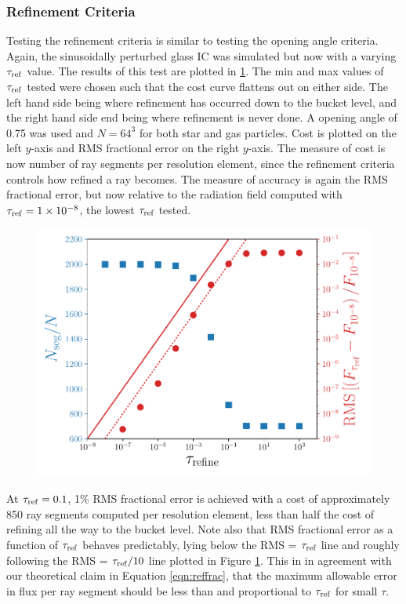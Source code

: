 \documentclass[fleq,usenatbib]{mnras}
\providecommand{\e}[1]{\ensuremath{\times10^{#1}}}
\newcommand{\tr}{\tau_{\rm ref}}
\begin{document}
\subsubsection{Refinement Criteria}
Testing the refinement criteria is similar to testing the opening angle 
criteria. Again, the sinusoidally perturbed glass IC was simulated but now with 
a varying $\tr$ value. The results of this test are plotted in 
\ref{fig:refcrit}. The min and max values of $\tr$ tested were 
chosen such that the cost curve flattens out on either side. The left  hand 
side being where refinement has occurred down to the bucket level, and the 
right hand side end being where refinement is never done. 
A opening angle of 0.75 was used and $N=64^3$ for both star and gas particles. 
Cost is plotted on the left $y$-axis and RMS fractional error on the right 
$y$-axis. The measure of cost is now number of ray segments per resolution 
element, since the refinement criteria controls how refined a ray becomes. 
The measure of accuracy is again the RMS fractional error, but now relative to 
the radiation field computed with $\tr=1\e{-8}$, the lowest $\tr$ tested.
\begin{figure}
\includegraphics[width=1\linewidth]{Figures/refinement_criteria.pdf}
\caption{}
\label{fig:refcrit}
\end{figure}

At $\tr=0.1$, 1\% RMS fractional error is achieved with a cost of 
approximately 850 ray segments computed per resolution element, less than half 
the cost of refining all the way to the bucket level. Note also that RMS 
fractional error as a function of $\tr$ behaves predictably, lying below the 
RMS = $\tr$ line and roughly following the RMS = $\tr/10$ line plotted in 
Figure \ref{fig:refcrit}. This in in agreement with our theoretical claim in 
Equation \ref{eqn:reffrac}, that the maximum allowable error in flux per ray 
segment should be less than and proportional to $\tr$ for small $\tau$. 
\end{document}
